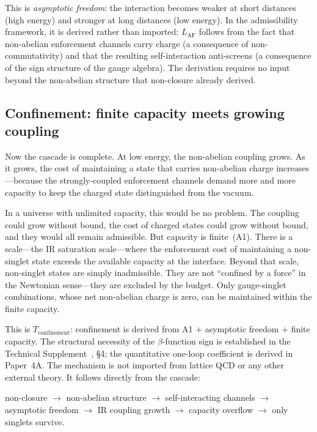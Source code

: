 \documentclass[11pt]{article}
\begin{document}
This is \emph{asymptotic freedom}: the interaction becomes weaker at short distances (high energy) and stronger at long distances (low energy).  In the admissibility framework, it is derived rather than imported: $L_{\mathrm{AF}}$ follows from the fact that non-abelian enforcement channels carry charge (a consequence of non-commutativity) and that the resulting self-interaction anti-screens (a consequence of the sign structure of the gauge algebra).  The derivation requires no input beyond the non-abelian structure that non-closure already derived.

\subsection{Confinement: finite capacity meets growing coupling}

Now the cascade is complete.  At low energy, the non-abelian coupling grows.  As it grows, the cost of maintaining a state that carries non-abelian charge increases---because the strongly-coupled enforcement channels demand more and more capacity to keep the charged state distinguished from the vacuum.

In a universe with unlimited capacity, this would be no problem.  The coupling could grow without bound, the cost of charged states could grow without bound, and they would all remain admissible.  But capacity is finite~(A1).  There is a scale---the IR saturation scale---where the enforcement cost of maintaining a non-singlet state exceeds the available capacity at the interface.  Beyond that scale, non-singlet states are simply inadmissible.  They are not ``confined by a force'' in the Newtonian sense---they are excluded by the budget.  Only gauge-singlet combinations, whose net non-abelian charge is zero, can be maintained within the finite capacity.

This is $T_{\mathrm{confinement}}$: confinement is derived from A1 $+$ asymptotic freedom $+$ finite capacity.  The structural necessity of the $\beta$-function sign is established in the Technical Supplement~\cite{BrookeP2Supplement}, \S4; the quantitative one-loop coefficient is derived in Paper~4A.  The mechanism is not imported from lattice QCD or any other external theory.  It follows directly from the cascade:
\begin{center}
\small
non-closure $\to$ non-abelian structure $\to$ self-interacting channels $\to$ asymptotic freedom $\to$ IR coupling growth $\to$ capacity overflow $\to$ only singlets survive.
\end{center}
\end{document}
